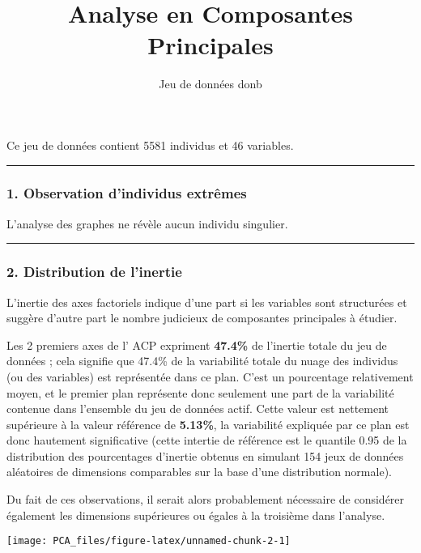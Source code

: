 \documentclass[]{article}
\title{Analyse en Composantes Principales}
\author{Jeu de données donb}
\date{}
\begin{document}
\maketitle

Ce jeu de données contient 5581 individus et 46 variables.

\begin{center}\rule{0.5\linewidth}{\linethickness}\end{center}

\subsubsection{1. Observation d'individus
extrêmes}\label{observation-dindividus-extremes}

L'analyse des graphes ne révèle aucun individu singulier.

\begin{center}\rule{0.5\linewidth}{\linethickness}\end{center}

\subsubsection{2. Distribution de
l'inertie}\label{distribution-de-linertie}

L'inertie des axes factoriels indique d'une part si les variables sont
structurées et suggère d'autre part le nombre judicieux de composantes
principales à étudier.

Les 2 premiers axes de l' ACP expriment \textbf{47.4\%} de l'inertie
totale du jeu de données ; cela signifie que 47.4\% de la variabilité
totale du nuage des individus (ou des variables) est représentée dans ce
plan. C'est un pourcentage relativement moyen, et le premier plan
représente donc seulement une part de la variabilité contenue dans
l'ensemble du jeu de données actif. Cette valeur est nettement
supérieure à la valeur référence de \textbf{5.13\%}, la variabilité
expliquée par ce plan est donc hautement significative (cette intertie
de référence est le quantile 0.95 de la distribution des pourcentages
d'inertie obtenus en simulant 154 jeux de données aléatoires de
dimensions comparables sur la base d'une distribution normale).

Du fait de ces observations, il serait alors probablement nécessaire de
considérer également les dimensions supérieures ou égales à la troisième
dans l'analyse.

\begin{center}\texttt{[image: PCA\_files/figure-latex/unnamed-chunk-2-1]} \end{center}
\end{document}
